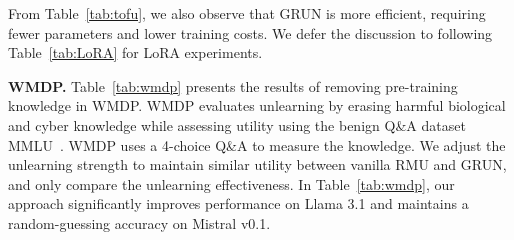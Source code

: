 From Table~\ref{tab:tofu}, we also observe that GRUN is more efficient, requiring fewer parameters and lower training costs. We defer the discussion to following Table~\ref{tab:LoRA} for LoRA experiments.

\begin{table}[t]
    \centering
    \vspace{-0.1in}
    \caption{Unlearning results on WMDP}
    \vspace{-0.25in}
  \label{tab:wmdp}
\end{table}

\noindent\textbf{WMDP.} Table~\ref{tab:wmdp} presents the results of removing pre-training knowledge in WMDP. WMDP evaluates unlearning by erasing harmful biological and cyber knowledge while assessing utility using the benign Q\&A dataset {MMLU~\cite{hendrycks2020measuring}}. WMDP uses a 4-choice Q\&A to measure the knowledge. We adjust the unlearning strength to maintain similar utility between vanilla RMU and GRUN, and only compare the unlearning effectiveness. In Table~\ref{tab:wmdp}, our approach significantly improves performance on Llama 3.1 and maintains a random-guessing accuracy on Mistral v0.1.

